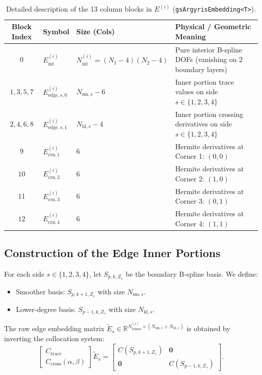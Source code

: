\documentclass[11pt,a4paper]{article}
\newcommand{\R}{\mathbb{R}}
\newcommand{\mb}[1]{\mathbf{#1}}
\begin{document}
\begin{table}[htbp]
\centering
\caption{Detailed description of the 13 column blocks in $E^{(i)}$ (\texttt{gsArgyrisEmbedding<T>}).}
\label{tab:13blocks}
\vspace{0.2cm}
\begin{tabular}{clll}
\toprule
\textbf{Block Index} & \textbf{Symbol} & \textbf{Size (Cols)} & \textbf{Physical / Geometric Meaning} \\
\midrule
$0$ & $E_{\text{int}}^{(i)}$ & $N_{\text{int}}^{(i)} = (N_1-4)(N_2-4)$ & Pure interior B-spline DOFs (vanishing on 2 boundary layers) \\
$1, 3, 5, 7$ & $E_{\text{edge}, s, 0}^{(i)}$ & $N_{\text{sm}, s} - 6$ & Inner portion trace values on side $s \in \{1,2,3,4\}$ \\
$2, 4, 6, 8$ & $E_{\text{edge}, s, 1}^{(i)}$ & $N_{\text{ld}, s} - 4$ & Inner portion crossing derivatives on side $s \in \{1,2,3,4\}$ \\
$9$ & $E_{\text{crn}, 1}^{(i)}$ & $6$ & Hermite derivatives at Corner 1: $(0,0)$ \\
$10$ & $E_{\text{crn}, 2}^{(i)}$ & $6$ & Hermite derivatives at Corner 2: $(1,0)$ \\
$11$ & $E_{\text{crn}, 3}^{(i)}$ & $6$ & Hermite derivatives at Corner 3: $(0,1)$ \\
$12$ & $E_{\text{crn}, 4}^{(i)}$ & $6$ & Hermite derivatives at Corner 4: $(1,1)$ \\
\bottomrule
\end{tabular}
\end{table}

\subsection{Construction of the Edge Inner Portions}
For each side $s \in \{1,2,3,4\}$, let $S_{p, k, Z_s}$ be the boundary B-spline basis. We define:
\begin{itemize}
    \item Smoother basis: $S_{p, k+1, Z_s}$ with size $N_{\text{sm}, s}$.
    \item Lower-degree basis: $S_{p-1, k, Z_s}$ with size $N_{\text{ld}, s}$.
\end{itemize}
The raw edge embedding matrix $\widetilde{E}_s \in \R^{N_{\text{tensor}}^{(i)} \times (N_{\text{sm}, s} + N_{\text{ld}, s})}$ is obtained by inverting the collocation system:
\begin{equation}
    \begin{bmatrix}
        C_{\text{trace}} \\
        C_{\text{cross}}(\alpha, \beta)
    \end{bmatrix} \widetilde{E}_s = \begin{bmatrix}
        C(S_{p, k+1, Z_s}) & \mb{0} \\
        \mb{0} & C(S_{p-1, k, Z_s})
    \end{bmatrix}.
\end{equation}
\end{document}
